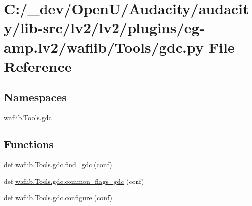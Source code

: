 \hypertarget{lv2_2plugins_2eg-amp_8lv2_2waflib_2_tools_2gdc_8py}{}\section{C\+:/\+\_\+dev/\+Open\+U/\+Audacity/audacity/lib-\/src/lv2/lv2/plugins/eg-\/amp.lv2/waflib/\+Tools/gdc.py File Reference}
\label{lv2_2plugins_2eg-amp_8lv2_2waflib_2_tools_2gdc_8py}
\subsection*{Namespaces}
\begin{DoxyCompactItemize}
\item 
 \hyperlink{namespacewaflib_1_1_tools_1_1gdc}{waflib.\+Tools.\+gdc}
\end{DoxyCompactItemize}
\subsection*{Functions}
\begin{DoxyCompactItemize}
\item 
def \hyperlink{namespacewaflib_1_1_tools_1_1gdc_a1cd5f335a15d375707119a14d470eb68}{waflib.\+Tools.\+gdc.\+find\+\_\+gdc} (conf)
\item 
def \hyperlink{namespacewaflib_1_1_tools_1_1gdc_a559e20c4ab6c3d2f15571b2a6abcebff}{waflib.\+Tools.\+gdc.\+common\+\_\+flags\+\_\+gdc} (conf)
\item 
def \hyperlink{namespacewaflib_1_1_tools_1_1gdc_aa2ddc4f30ce9ee26ba9d494193c2efae}{waflib.\+Tools.\+gdc.\+configure} (conf)
\end{DoxyCompactItemize}
